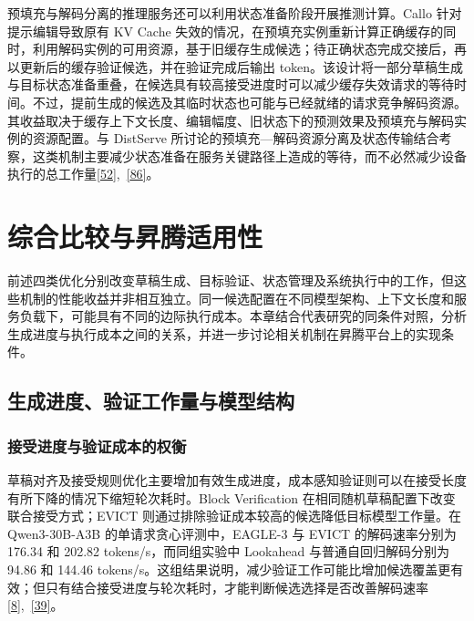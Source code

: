 \documentclass[11pt,a4paper,UTF8,fontset=none,scheme=plain,zihao=-4]{ctexart}
\begin{document}
预填充与解码分离的推理服务还可以利用状态准备阶段开展推测计算。Callo
针对提示编辑导致原有 KV Cache
失效的情况，在预填充实例重新计算正确缓存的同时，利用解码实例的可用资源，基于旧缓存生成候选；待正确状态完成交接后，再以更新后的缓存验证候选，并在验证完成后输出
token。该设计将一部分草稿生成与目标状态准备重叠，在候选具有较高接受进度时可以减少缓存失效请求的等待时间。不过，提前生成的候选及其临时状态也可能与已经就绪的请求竞争解码资源。其收益取决于缓存上下文长度、编辑幅度、旧状态下的预测效果及预填充与解码实例的资源配置。与
DistServe
所讨论的预填充---解码资源分离及状态传输结合考察，这类机制主要减少状态准备在服务关键路径上造成的等待，而不必然减少设备执行的总工作量\protect\hyperlink{ref-callo}{{[}52{]}},~\protect\hyperlink{ref-distserve}{{[}86{]}}。

\hypertarget{section-7}{%
\section{综合比较与昇腾适用性}\label{section-7}}

前述四类优化分别改变草稿生成、目标验证、状态管理及系统执行中的工作，但这些机制的性能收益并非相互独立。同一候选配置在不同模型架构、上下文长度和服务负载下，可能具有不同的边际执行成本。本章结合代表研究的同条件对照，分析生成进度与执行成本之间的关系，并进一步讨论相关机制在昇腾平台上的实现条件。

\hypertarget{section-7-1}{%
\subsection{生成进度、验证工作量与模型结构}\label{section-7-1}}

\hypertarget{section-7-1-1}{%
\subsubsection{接受进度与验证成本的权衡}\label{section-7-1-1}}

草稿对齐及接受规则优化主要增加有效生成进度，成本感知验证则可以在接受长度有所下降的情况下缩短轮次耗时。Block
Verification 在相同随机草稿配置下改变联合接受方式；EVICT
则通过排除验证成本较高的候选降低目标模型工作量。在 Qwen3-30B-A3B
的单请求贪心评测中，EAGLE-3 与 EVICT 的解码速率分别为 176.34 和 202.82
tokens/s，而同组实验中 Lookahead 与普通自回归解码分别为 94.86 和 144.46
tokens/s。这组结果说明，减少验证工作可能比增加候选覆盖更有效；但只有结合接受进度与轮次耗时，才能判断候选选择是否改善解码速率\protect\hyperlink{ref-evict}{{[}8{]}},~\protect\hyperlink{ref-blockverification}{{[}39{]}}。
\end{document}
